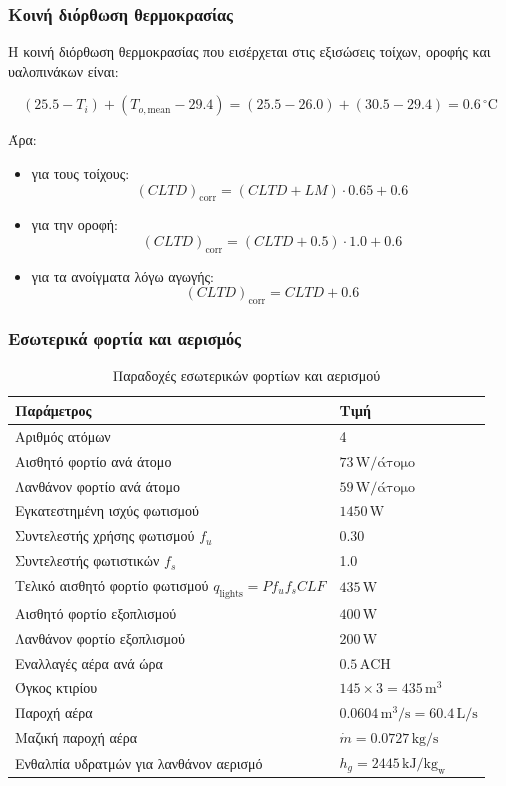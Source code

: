\documentclass[12pt,a4paper]{article}
\begin{document}
\subsubsection{Κοινή διόρθωση θερμοκρασίας}

Η κοινή διόρθωση θερμοκρασίας που εισέρχεται στις εξισώσεις τοίχων, οροφής και
υαλοπινάκων είναι:

\[
(25.5 - T_i) + (T_{o,\mathrm{mean}} - 29.4)
=
(25.5 - 26.0) + (30.5 - 29.4)
=
0.6\,^\circ\mathrm{C}
\]

Άρα:

\begin{itemize}
\item για τους τοίχους:
\[
(CLTD)_{\text{corr}} = (CLTD + LM)\cdot 0.65 + 0.6
\]
\item για την οροφή:
\[
(CLTD)_{\text{corr}} = (CLTD + 0.5)\cdot 1.0 + 0.6
\]
\item για τα ανοίγματα λόγω αγωγής:
\[
(CLTD)_{\text{corr}} = CLTD + 0.6
\]
\end{itemize}

\subsubsection{Εσωτερικά φορτία και αερισμός}

\begin{table}[H]
\centering
\caption{Παραδοχές εσωτερικών φορτίων και αερισμού}
\begin{tabularx}{\textwidth}{L C{4.3cm}}
\toprule
\textbf{Παράμετρος} & \textbf{Τιμή} \\
\midrule
Αριθμός ατόμων & 4 \\
Αισθητό φορτίο ανά άτομο & \(73\,\mathrm{W/άτομο}\) \\
Λανθάνον φορτίο ανά άτομο & \(59\,\mathrm{W/άτομο}\) \\
Εγκατεστημένη ισχύς φωτισμού & \(1450\,\mathrm{W}\) \\
Συντελεστής χρήσης φωτισμού \(f_u\) & 0.30 \\
Συντελεστής φωτιστικών \(f_s\) & 1.0 \\
Τελικό αισθητό φορτίο φωτισμού \(q_{\text{lights}} = P f_u f_s CLF\) & \(435\,\mathrm{W}\) \\
Αισθητό φορτίο εξοπλισμού & \(400\,\mathrm{W}\) \\
Λανθάνον φορτίο εξοπλισμού & \(200\,\mathrm{W}\) \\
Εναλλαγές αέρα ανά ώρα & \(0.5\,\mathrm{ACH}\) \\
Όγκος κτιρίου & \(145 \times 3 = 435\,\mathrm{m^3}\) \\
Παροχή αέρα & \(0.0604\,\mathrm{m^3/s} = 60.4\,\mathrm{L/s}\) \\
Μαζική παροχή αέρα & \(\dot m = 0.0727\,\mathrm{kg/s}\) \\
Ενθαλπία υδρατμών για λανθάνον αερισμό & \(h_g = 2445\,\mathrm{kJ/kg_w}\) \\
\bottomrule
\end{tabularx}
\end{table}
\end{document}
